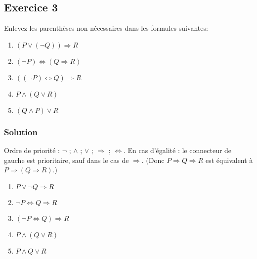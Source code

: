 % 
% 
% 



\subsection*{Exercice 3}
Enlevez les parenthèses non nécessaires dans les formules suivantes:
\begin{enumerate}
	\item $(P \lor (\neg Q)) \Rightarrow R$
	\item $(\neg P) \Leftrightarrow (Q \Rightarrow R)$
	\item $((\neg P) \Leftrightarrow Q) \Rightarrow R$
	\item $P \land (Q \lor R)$
	\item $(Q \land P) \lor R$
\end{enumerate}


\subsubsection*{Solution}
    Ordre de priorité : $\neg$ ; $\land$ ; $\lor$ ; $\Rightarrow$ ; $\Leftrightarrow$.
    En cas d'égalité : le connecteur de gauche est prioritaire, sauf dans le cas de $\Rightarrow$.
    (Donc $P \Rightarrow Q \Rightarrow R$ est équivalent à $P \Rightarrow (Q \Rightarrow R)$.)
    
    \begin{enumerate}
        \item $P \lor \neg Q \Rightarrow R$
        \item $\neg P \Leftrightarrow Q \Rightarrow R$
        \item $(\neg P \Leftrightarrow Q) \Rightarrow R$
        \item $P \land (Q \lor R)$
        \item $P \land Q \lor R$
    \end{enumerate}

